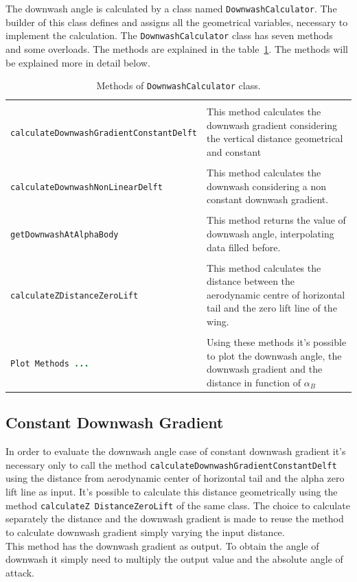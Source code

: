 The downwash angle is calculated by a class named \texttt{DownwashCalculator}. The builder of this class defines and assigns all the geometrical variables, necessary to implement the calculation. The  \texttt{DownwashCalculator} class has seven methods and some overloads. The methods are explained in the table~\ref{table:Table1}. The methods will be explained more in detail below.

\begin{table}[H]
\begin{tabular}{p{7cm}p{7.5cm}}
\toprule
 \\[0.1	cm] 
\lstinline[language=Java]!calculateDownwashGradientConstantDelft! & This method calculates the downwash gradient  considering the vertical distance geometrical and constant\\ \hline \\[0.1	cm] 
\lstinline[language=Java]!calculateDownwashNonLinearDelft! &This method calculates the downwash considering a non constant downwash gradient.  \\ \hline \\ [0.1cm]
\lstinline[language=Java]!getDownwashAtAlphaBody! & This method returns the value of downwash angle, interpolating data filled before.\\ \hline \\[0.1cm]
\lstinline[language=Java]!calculateZDistanceZeroLift!	& This method calculates the distance between the aerodynamic centre of horizontal tail and the zero lift line of the wing. \\ \hline \\[0.1cm]
\lstinline[language=Java]!Plot Methods ...! & Using these methods it's possible to plot the downwash angle, the downwash gradient and the distance in function of $\alpha_{B}$ \\
\bottomrule
\end{tabular}
\caption{Methods of \texttt{DownwashCalculator} class.}
\label{table:Table1}
\end{table}


\subsection{Constant Downwash Gradient}
In order to evaluate the downwash angle case of constant downwash gradient it's necessary only to call the method \texttt{calculateDownwashGradientConstantDelft} using the distance from aerodynamic center of horizontal tail and the alpha zero lift line as input. It's possible to calculate this distance geometrically using the method \texttt{calculateZ DistanceZeroLift} of the same class. The choice to calculate separately the distance and the downwash gradient is made to reuse the method to calculate downwash gradient simply varying the input distance. \\ 
This method has the downwash gradient as output. To obtain the angle of downwash it simply need to multiply the output value and the absolute angle of attack. 

